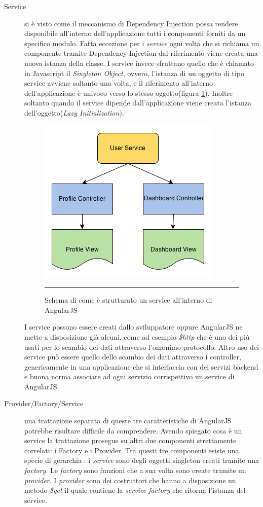 \begin{description}
\item[Service] si è visto come il meccanismo di Dependency Injection possa rendere disponibile all'interno dell'applicazione tutti i componenti forniti da un specifico modulo. Fatta eccezione per i \emph{service} ogni volta che si richiama un componente tramite Dependency Injection dal riferimento viene creata una nuova istanza della classe. I service invece sfruttano quello che è chiamato in Javascript il \emph{Singleton Object}, ovvero, l'istanza di un oggetto di tipo service avviene soltanto una volta, e il riferimento all'interno dell'applicazione è univoco verso lo stesso oggetto(figura \ref{fig:AngularJS-Singleton}). Inoltre soltanto quando il service dipende dall'applicazione viene creata l'istanza dell'oggetto(\emph{Lazy Initialization}).

\begin{figure}[htbp]
  \centering
    \includegraphics[scale=0.75]{Figures/angularjs-service-singleton-diagram.png}  
    \rule{35em}{0.5pt}
  \caption[AngularJS Singleton]{Schema di come è strutturato un service all'interno di AngularJS}
  \label{fig:AngularJS-Singleton}
\end{figure}

I service possono essere creati dallo sviluppatore oppure AngularJS ne mette a disposizione già alcuni, come ad esempio \emph{\$http} che è uno dei più usati per lo scambio dei dati attraverso l'omonimo protocollo. Altro uso dei service può essere quello dello scambio dei dati attraverso i controller, genericamente in una applicazione che si interfaccia con dei servizi backend e buona norma associare ad ogni servizio corrispettivo un service di AngularJS.

\item[Provider/Factory/Service] una trattazione separata di queste tre caratteristiche di AngularJS potrebbe risultare difficile da comprendere. Avendo spiegato cosa è un service la trattazione prosegue su altri due componenti strettamente correlati: i Factory e i Provider.
Tra questi tre componenti esiste una specie di gerarchia : i \textit{service} sono degli oggetti singleton creati tramite una \textit{factory}. Le \textit{factory} sono funzioni che a sua volta sono create tramite un \textit{provider}. I \textit{provider} sono dei costruttori che hanno a disposizione un metodo \emph{\$get} il quale contiene la \emph{service factory} che ritorna l'istanza del service.


\end{description}
